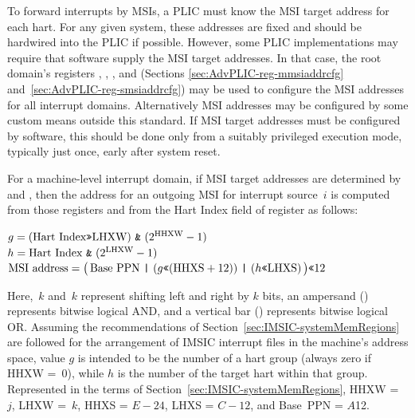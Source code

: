 To forward interrupts by MSIs, a PLIC must know the MSI target address
for each hart.
For any given system, these addresses are fixed and should be hardwired
into the PLIC if possible.
However, some PLIC implementations may require that software supply the
MSI target addresses.
In that case, the root domain's registers ,
, , and 
(Sections \ref{sec:AdvPLIC-reg-mmsiaddrcfg}
and~\ref{sec:AdvPLIC-reg-smsiaddrcfg}) may be used to configure the
MSI addresses for all interrupt domains.
Alternatively MSI addresses may be configured by some custom means
outside this standard.
If MSI target addresses must be configured by software, this should
be done only from a suitably privileged execution mode, typically just
once, early after system reset.

For a machine-level interrupt domain, if MSI target addresses are
determined by  and , then the address
for an outgoing MSI for interrupt source~$i$ is computed from those
registers and from the Hart Index field of register  as
follows:
\begin{displayLinesTable}
$g =
  (\mbox{Hart Index\z{>>}LHXW})\mbox{ \z{\&} }(\mbox{2}^{\rm HHXW}-\mbox{1})$\\
$h = \mbox{Hart Index \z{\&} }(\mbox{2}^{\rm LHXW}-\mbox{1})$\\
$\mbox{MSI address} =
  \bigl(\,
    \mbox{Base PPN \z{|} }(g\mbox{\z{<<}}(\mbox{HHXS}+\mbox{12}))
      \mbox{ \z{|} }(h\mbox{\z{<<}LHXS})
  \,\bigr)\mbox{\z{<<}12}$
\end{displayLinesTable}
Here, \z{<<}$\,k$ and \z{>>}$\,k$ represent shifting left and right by
$k$ bits, an ampersand (\z{\&}) represents bitwise logical AND, and a
vertical bar (\z{|}) represents bitwise logical OR.
Assuming the recommendations of
Section~\ref{sec:IMSIC-systemMemRegions} are followed for the
arrangement of IMSIC interrupt files in the machine's address space,
value $g$ is intended to be the number of a hart group (always zero
if HHXW =~0), while $h$ is the number of the target hart within that
group.
Represented in the terms of Section~\ref{sec:IMSIC-systemMemRegions},
HHXW =~$j$, LHXW =~$k$, HHXS = ${E-24}$, LHXS = ${C-12}$, and
Base~PPN = $A$\z{>>}12.

